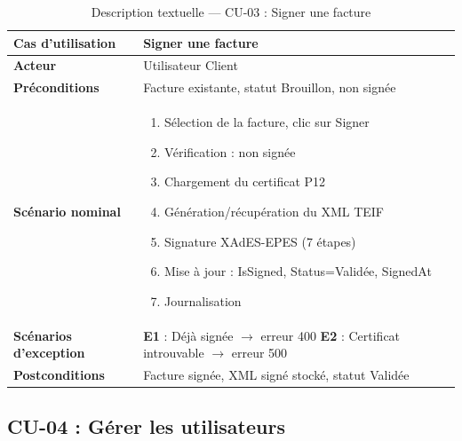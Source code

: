 \documentclass[a4paper,12pt]{report}
\begin{document}
\begin{table}[htbp]
\centering
\caption{Description textuelle — CU-03 : Signer une facture}
\begin{tabularx}{\textwidth}{|l|X|}
\hline
\textbf{Cas d'utilisation} & Signer une facture \\
\hline
\textbf{Acteur} & Utilisateur Client \\
\hline
\textbf{Préconditions} & Facture existante, statut Brouillon, non signée \\
\hline
\textbf{Scénario nominal} &
\begin{enumerate}[nosep, leftmargin=*]
    \item Sélection de la facture, clic sur Signer
    \item Vérification : non signée
    \item Chargement du certificat P12
    \item Génération/récupération du XML TEIF
    \item Signature XAdES-EPES (7 étapes)
    \item Mise à jour : IsSigned, Status=Validée, SignedAt
    \item Journalisation
\end{enumerate} \\
\hline
\textbf{Scénarios d'exception} &
\textbf{E1} : Déjà signée $\rightarrow$ erreur 400 \newline
\textbf{E2} : Certificat introuvable $\rightarrow$ erreur 500 \\
\hline
\textbf{Postconditions} & Facture signée, XML signé stocké, statut Validée \\
\hline
\end{tabularx}
\end{table}

\subsection{CU-04 : Gérer les utilisateurs}
\end{document}
